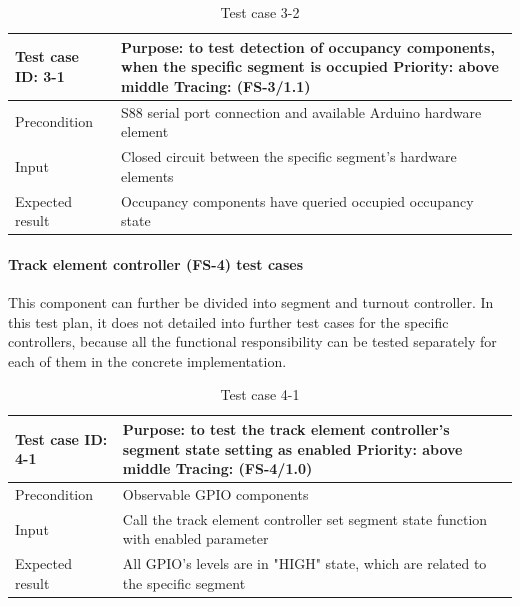 \begin{table}[H]
	\caption{Test case 3-2}
	\label{table:TCase-FS3-2}
	\begin{center}
		\renewcommand{\arraystretch}{1.8}
		\begin{tabu} 
			to 0.9 \textwidth
			{  X[0.4, c] X[c] }
			\toprule
			Test case ID: 3-1 & Purpose: to test detection of occupancy components, when the specific segment is occupied \newline Priority: above middle \newline Tracing: (FS-3/1.1)\\ \midrule
			Precondition & S88 serial port connection and available Arduino hardware element \\
			Input & Closed circuit between the specific segment's hardware elements  \\
			Expected result & Occupancy components have queried occupied occupancy state \\ \bottomrule
		\end{tabu}
	\end{center}
\end{table} 

\paragraph{Track element controller (FS-4)  test cases} This component can further be divided into segment and turnout controller. In this test plan, it does not detailed into further test cases for the specific controllers, because all the functional responsibility can be tested separately for each of them in the concrete implementation.

\begin{table}[H]
	\caption{Test case 4-1}
	\label{table:TCase-FS4-1}
	\begin{center}
		\renewcommand{\arraystretch}{1.8}
		\begin{tabu} 
			to 0.9 \textwidth
			{  X[0.4, c] X[c] }
			\toprule
			Test case ID: 4-1 & Purpose: to test the track element controller's segment state setting as enabled \newline Priority: above middle \newline Tracing: (FS-4/1.0)\\ \midrule
			Precondition & Observable GPIO components \\
			Input & Call the track element controller set segment state function with enabled parameter  \\
			Expected result & All GPIO's levels are in "HIGH" state, which are related to the specific segment \\ \bottomrule
		\end{tabu}
	\end{center}
\end{table}

